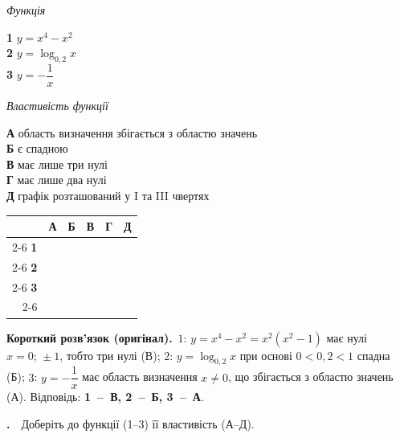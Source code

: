 \documentclass[12pt]{article}
\newcommand{\matchingGrid}{%
    \begingroup
    \renewcommand{\arraystretch}{1.15}
    \setlength{\tabcolsep}{4pt}
    \footnotesize
    \begin{tabular}{r|c|c|c|c|c|}
         \multicolumn{1}{c}{} & \multicolumn{1}{c}{\textbf{А}} & \multicolumn{1}{c}{\textbf{Б}} & \multicolumn{1}{c}{\textbf{В}} & \multicolumn{1}{c}{\textbf{Г}} & \multicolumn{1}{c}{\textbf{Д}} \\ \cline{2-6}
         \textbf{1} & \phantom{X} & \phantom{X} & \phantom{X} & \phantom{X} & \phantom{X} \\ \cline{2-6}
         \textbf{2} & & & & & \\ \cline{2-6}
         \textbf{3} & & & & & \\ \cline{2-6}
    \end{tabular}
    \endgroup
}
\newcounter{zad}
\newcommand{\zadnum}{\stepcounter{zad}\textbf{\thezad.}\ \ }
\newcommand{\solution}[1]{%
\par\vspace{0.12cm}
\begin{tcolorbox}[colback=titleBg!45, colframe=mainGreen!55, boxrule=0.4pt, arc=2pt,
    left=6pt, right=6pt, top=3pt, bottom=3pt, breakable]
\footnotesize\textbf{Короткий розв'язок (оригінал).}\ #1
\end{tcolorbox}
\par\vspace{0.12cm}
}
\begin{document}
\vspace{0.3cm}
\noindent
\begin{minipage}[t]{0.34\textwidth}
\textit{Функція}\par\vspace{0.2cm}
\textbf{1} \quad $y = x^4 - x^2$\\[0.35cm]
\textbf{2} \quad $y = \log_{0{,}2} x$\\[0.35cm]
\textbf{3} \quad $y = -\dfrac{1}{x}$
\end{minipage}
\hfill
\begin{minipage}[t]{0.52\textwidth}
\textit{Властивість функції}\par\vspace{0.2cm}
\textbf{А} \quad область визначення збігається з областю значень\\[0.12cm]
\textbf{Б} \quad є спадною\\[0.12cm]
\textbf{В} \quad має лише три нулі\\[0.12cm]
\textbf{Г} \quad має лише два нулі\\[0.12cm]
\textbf{Д} \quad графік розташований у I та III чвертях
\end{minipage}
\hfill
\begin{minipage}[t]{0.12\textwidth}
\vspace{0.5cm}
\begin{flushright}\matchingGrid\end{flushright}
\end{minipage}
\par\vspace{0.5cm}
\solution{$1$: $y=x^4-x^2=x^2(x^2-1)$ має нулі $x=0;\,\pm1$, тобто три нулі (В); $2$: $y=\log_{0{,}2}x$ при основі $0<0{,}2<1$ спадна (Б); $3$: $y=-\dfrac1x$ має область визначення $x\ne0$, що збігається з областю значень (А). Відповідь: \textbf{1~--~В, 2~--~Б, 3~--~А}.}
\zadnum Доберіть до функції (1--3) її властивість (А--Д).
\end{document}
